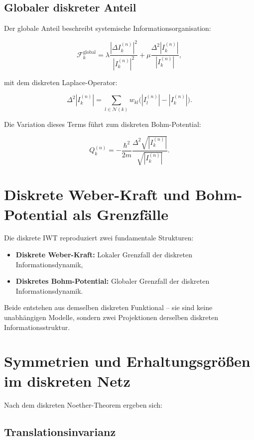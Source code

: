 \subsection{Globaler diskreter Anteil}
\label{sub:globaler_anteil}

Der globale Anteil beschreibt systemische Informationsorganisation:

\[
\mathcal{F}_k^{\text{global}} = \lambda \frac{|\Delta I_k^{(n)}|^2}{|I_k^{(n)}|^2} + \mu \frac{\Delta^2 |I_k^{(n)}|}{|I_k^{(n)}|},
\]

mit dem diskreten Laplace-Operator:

\[
\Delta^2 |I_k^{(n)}| = \sum_{l \in \mathcal{N}(k)} w_{kl} \bigl( |I_l^{(n)}| - |I_k^{(n)}| \bigr).
\]

Die Variation dieses Terms führt zum diskreten Bohm-Potential:

\[
Q_k^{(n)} = -\frac{\hbar^2}{2m} \frac{\Delta^2 \sqrt{|I_k^{(n)}|}}{\sqrt{|I_k^{(n)}|}}.
\]

\section{Diskrete Weber-Kraft und Bohm-Potential als Grenzfälle}
\label{sec:grenzfaelle_weber_bohm}

Die diskrete IWT reproduziert zwei fundamentale Strukturen:

\begin{itemize}
    \item \textbf{Diskrete Weber-Kraft:} Lokaler Grenzfall der diskreten Informationsdynamik,
    \item \textbf{Diskretes Bohm-Potential:} Globaler Grenzfall der diskreten Informationsdynamik.
\end{itemize}

Beide entstehen aus demselben diskreten Funktional – sie sind keine unabhängigen Modelle, sondern zwei Projektionen derselben diskreten Informationsstruktur.

\section{Symmetrien und Erhaltungsgrößen im diskreten Netz}
\label{sec:symmetrien_erhaltung}

Nach dem diskreten Noether-Theorem ergeben sich:

\subsection{Translationsinvarianz}
\label{sub:translationsinvarianz}

